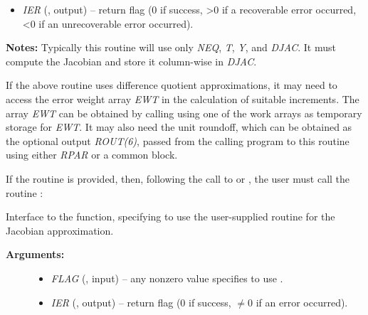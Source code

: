 \documentclass[letterpaper,10pt,english]{sphinxmanual}
\begin{document}
\begin{fulllineitems}
\begin{description}
\begin{itemize}
\item {} 
\emph{IER} (, output) -- return flag (0 if success, \textgreater{}0 if a recoverable error
occurred, \textless{}0 if an unrecoverable error occurred).

\end{itemize}

\end{description}

\textbf{Notes:} Typically this routine will use only \emph{NEQ}, \emph{T}, \emph{Y}, and
\emph{DJAC}. It must compute the Jacobian and store it column-wise in \emph{DJAC}.

\end{fulllineitems}


If the above routine uses difference quotient approximations, it may
need to access the error weight array \emph{EWT} in the calculation of
suitable increments. The array \emph{EWT} can be obtained by calling
{\hyperref[f_interface/Optional_output:f/_/FARKGETERRWEIGHTS]{}} using one of the work arrays as
temporary storage for \emph{EWT}. It may also need the unit roundoff, which
can be obtained as the optional output \emph{ROUT(6)}, passed from the
calling program to this routine using either \emph{RPAR} or a common block.

If the {\hyperref[f_interface/Usage:f/_/FARKDJAC]{}} routine is provided, then, following the
call to {\hyperref[f_interface/Usage:f/_/FARKDENSE]{}} or {\hyperref[f_interface/Usage:f/_/FARKLAPACKDENSE]{}}, the user
must call the routine {\hyperref[f_interface/Usage:f/_/FARKDENSESETJAC]{}}:

\begin{fulllineitems}
\label{f_interface/Usage:f/_/FARKDENSESETJAC}
Interface to the  function, specifying
to use the user-supplied routine {\hyperref[f_interface/Usage:f/_/FARKDJAC]{}} for the
Jacobian approximation.
\begin{description}
\item[{\textbf{Arguments:}}] \leavevmode\begin{itemize}
\item {} 
\emph{FLAG} (, input) -- any nonzero value specifies to use
{\hyperref[f_interface/Usage:f/_/FARKDJAC]{}}.

\item {} 
\emph{IER} (, output) -- return flag (0 if success,
$\ne 0$ if an error occurred).

\end{itemize}

\end{description}

\end{fulllineitems}
\end{document}
